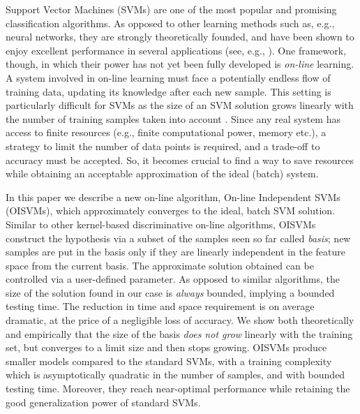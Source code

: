Support Vector Machines (SVMs) \cite{BGV92} are one of the most popular and
promising classification algorithms. As opposed to other learning methods such
as, e.g., neural networks, they are strongly theoretically founded, and have
been shown to enjoy excellent performance in several applications (see, e.g.,
\cite{Cristianini00}). One framework, though, in which their power has not yet
been fully developed is \emph{on-line} learning. A system involved in on-line
learning must face a potentially endless flow of training data, updating
its knowledge after each new sample.
This setting is particularly difficult for SVMs as the size of an SVM solution
grows linearly with the number of training samples taken into account \cite{Steinwart03}.
Since any real system
has access to finite resources (e.g., finite computational power, memory etc.),
a strategy to limit the number of data points is required, and a trade-off to accuracy
must be accepted. So, it becomes
crucial to find a way to save resources while obtaining an acceptable
approximation of the ideal (batch) system.

In this paper we describe a new on-line algorithm, On-line Independent SVMs
(OISVMs), which approximately converges to the ideal, batch SVM solution.
Similar to other kernel-based discriminative on-line algorithms, OISVMs
construct the hypothesis via a subset of the samples seen so far called
\emph{basis}; new samples are put in the basis only if they are linearly
independent in the feature space from the current basis.
The approximate solution obtained can be controlled via a user-defined
parameter. As opposed to similar algorithms,
the size of the solution found in our case is \emph{always} bounded, implying a
bounded testing time. The reduction in time and space requirement is on
average dramatic, at the price of a negligible loss of accuracy. We
show both theoretically and empirically that the size of the basis \emph{does
not grow} linearly with the training set, but converges to a limit size
and then stops growing.
OISVMs produce smaller models compared to the standard SVMs, with a
training complexity which is asymptotically quadratic in the number of
samples, and with bounded testing time. Moreover, they reach
near-optimal performance while retaining the good generalization power
of standard SVMs.

